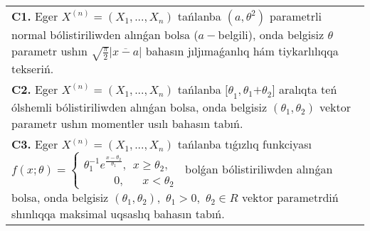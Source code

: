 \documentclass{article}
\begin{document}
\begin{tabular}{m{17cm}}
\textbf{C1.} 
Eger \(X^{(n)} = \left( X_{1},...,X_{n} \right)\) tańlanba \(\left( a,\theta^{2} \right)\) parametrli normal bólistiriliwden alınǵan bolsa (\(a -\)belgili), onda belgisiz \(\theta\) parametr ushın \(\sqrt{\frac{\pi}{2}}\left| \overline{x - a} \right|\) bahasın jıljımaǵanlıq hám tiykarlılıqqa tekseriń.
 \\
\textbf{C2.} 
Eger \(X^{(n)} = \left( X_{1},...,X_{n} \right)\) tańlanba \({\lbrack\theta}_{1},\theta_{1}{+ \theta}_{2}\rbrack\) aralıqta teń ólshemli bólistiriliwden alınǵan bolsa, onda belgisiz \(\left( \theta_{1},\theta_{2} \right)\) vektor parametr ushın momentler usılı bahasın tabıń.
 \\
\textbf{C3.} 
Eger \(X^{(n)} = \left( X_{1},...,X_{n} \right)\) tańlanba tıǵızlıq funkciyası
$f(x;\theta) = \left\{ \begin{matrix}
\theta_{1}^{- 1}e^{\frac{x - \theta_{2}}{\theta_{1}}},\ \ x \geq \theta_{2}, \\
\ \ \ \ \ \ \ \ \ \ \ \ 0,\ \ \ \ \ \ \ x < \theta_{2}
\end{matrix} \right.\ $
bolǵan bólistiriliwden alınǵan bolsa, onda belgisiz \(\left( \theta_{1},\theta_{2} \right),\) \(\theta_{1} > 0,\) \(\theta_{2} \in R\) vektor parametrdiń shınlıqqa maksimal uqsaslıq bahasın tabıń.
 \\

\end{tabular}
\vspace{1cm}
\end{document}
